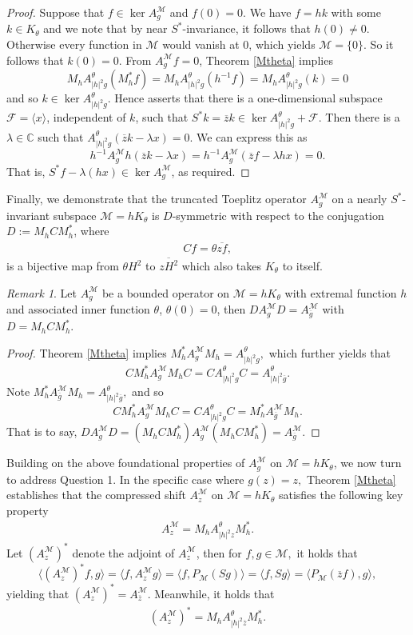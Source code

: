 \documentclass[12pt,reqno]{amsart}
\theoremstyle{definition}
\theoremstyle{remark}
\newtheorem{rem}[thm]{Remark}
\numberwithin{equation}{section}
\newcommand{\ol}{\overline}
\newcommand{\ma}{\mathcal}
\begin{document}
\begin{proof} Suppose that $f\in \ker A^\ma{M}_g$ and $f(0)=0$. We have $f=hk$ with some $k \in K_\theta$ and we note that by near $S^*$-invariance, it follows that  $h(0)\neq 0$. Otherwise every
function in $\ma{M}$ would vanish at $0$, which yields  $\ma{M} = \{0\}$. So it follows that $k(0) = 0.$  From $A^\ma{M}_gf = 0$, Theorem \ref{Mtheta} implies  $$M_hA_{|h|^2g}^\theta(M_h^*f)=M_hA_{|h|^2g}^\theta(h^{-1}f)=M_hA_{|h|^2g}^\theta(k)=0$$ and so $k\in \ker A^\theta_{|h|^2g}$. Hence  \cite[Corollary 3.2]{Lou} asserts that there is a one-dimensional subspace $\ma{F}=\langle x\rangle$, independent of $k$, such
that $ S^*k=\ol{z}k \in \ker A^\theta_{|h|^2g} +\ma{F}$.  Then there is a $\lambda \in \mathbb{C}$ such that $A^\theta_{|h|^2g}(\ol{z}k-\lambda x)=0.$  We can express this as  $$h^{-1} A_g^\ma{M} h(\ol{z}k-\lambda x)=h^{-1} A_g^\ma{M} (\ol{z}f-\lambda hx)=0.$$
That is, $S^*f-\lambda (hx) \in \ker A^\ma{M}_g$, as required.
\end{proof}
Finally, we demonstrate that the truncated Toeplitz operator $A_g^\ma{M}$ on a nearly $S^*$-invariant subspace  $\ma{M}=hK_\theta$ is $D$-symmetric with respect to the conjugation $D:=M_hCM_h^*$,  where  \begin{align}Cf=\theta \ol{z f},\label{Con} \end{align} is a bijective  map from $\theta H^2$ to $\ol{zH^2}$ which
also takes $K_\theta$ to itself.

\begin{rem}  \label{rem D-sym} Let $A_g^\ma{M}$ be a bounded operator on  $\ma{M}=hK_\theta$ with extremal function $h$ and associated inner function $\theta$, $\theta(0)=0$, then $ D A_g^\ma{M} D =  A_{\ol{g}}^\ma{M}$ with $D=M_hCM_h^*.$\end{rem}
\begin{proof} Theorem \ref{Mtheta} implies $M_h^* A_g^\ma{M} M_h = A^\theta_{|h|^2g},$ which further yields that $$ CM_h^* A_g^\ma{M} M_hC = CA^\theta_{|h|^2g}C=A^\theta_{|h|^2\ol{g}}.$$
Note $M_h^* A_{\ol{g}}^\ma{M} M_h = A^\theta_{|h|^2\ol{g}},$  and so
$$ CM_h^* A_g^\ma{M} M_hC = CA^\theta_{|h|^2g}C=M_h^* A_{\ol{g}}^\ma{M} M_h.$$
That is to say,
 $ DA_g^\ma{M} D=(M_hCM_h^*) A_g^\ma{M} (M_hCM_h^*) = A_{\ol{g}}^\ma{M}.$ \end{proof}

Building on the above foundational properties of $A_g^{\ma{M}}$ on $\ma{M}=hK_\theta$, we now turn to address Question 1. In the specific case where $g(z)=z,$   Theorem \ref{Mtheta} establishes that the compressed shift $A_z^\ma{M}$ on  $\ma{M}=hK_\theta$ satisfies the following key property
\begin{align} A_z^\ma{M}  =M_h A_{|h|^2 z}^\theta M_h^*.\label{SM} \end{align} Let $(A_z^\ma{M})^* $ denote the adjoint of $A_z^\ma{M}$, then for $f, g\in \ma{M},$ it holds that $$\langle (A_z^\ma{M})^* f,g\rangle=\langle f, A_z^\ma{M} g\rangle=\langle f,P_\ma{M}(Sg)\rangle=\langle f, Sg \rangle=\langle P_\ma{M}( \ol{z}f), g\rangle,$$ yielding  that     $ (A_z^\ma{M})^*=A_{\ol{z}}^\ma{M}.$ Meanwhile, it holds  that
\begin{align}(A_z^\ma{M})^*   =M_h A_{|h|^2\ol{z}}^\theta M_h^*.\label{SM*}\end{align}
\end{document}
